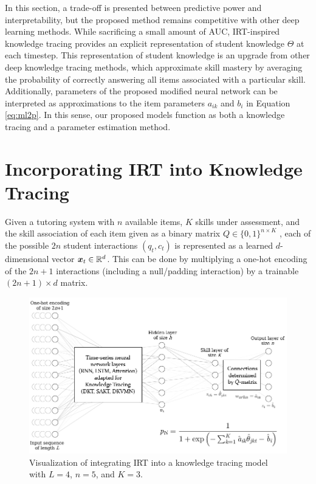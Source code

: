 In this section, a trade-off is presented between predictive power and interpretability, but the proposed method remains competitive with other deep learning methods. While sacrificing a small amount of AUC, IRT-inspired knowledge tracing provides an explicit representation of student knowledge $\Theta$ at each timestep. This representation of student knowledge is an upgrade from other deep knowledge tracing methods, which approximate skill mastery by averaging the probability of correctly answering all items associated with a particular skill. Additionally, parameters of the proposed modified neural network can be interpreted as approximations to the item parameters $a_{ik}$ and $b_i$ in Equation \ref{eq:ml2p}. In this sense, our proposed models function as both a knowledge tracing and a parameter estimation method.


\section{Incorporating IRT into Knowledge Tracing}
Given a tutoring system with $n$ available items, $K$ skills under assessment, and the skill association of each item given as a binary matrix $Q \in \{0,1\}^{n \times K}$ \cite{daSilva2018}, each of the possible $2n$ student interactions $(q_t, c_t)$ is represented as a learned $d$-dimensional vector $\boldsymbol{x}_t \in \mathbb{R}^d$. This can be done by multiplying a one-hot encoding of the $2n+1$ interactions (including a null/padding interaction) by a trainable $(2n+1) \times d$ matrix.

\begin{figure}[h]
  \centering
  \includegraphics[width=.95\textwidth]{img/kt_irt/kt_irt_visual_with_equation_2.png}
  \caption{Visualization of integrating IRT into a knowledge tracing model with $L=4$, $n=5$, and $K=3$.}
  \label{fig:kt_irt_visual}
\end{figure}

